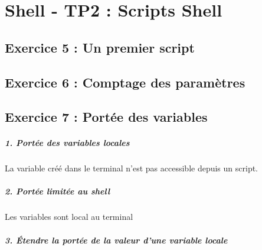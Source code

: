 \chapter{Shell - TP2 : Scripts Shell}
    \section{Exercice 5 : Un premier script}
        
    \section{Exercice 6 : Comptage des paramètres}
        
        
    \section{Exercice 7 : Portée des variables}
        \paragraph{1. Portée des variables locales}
            La variable créé dans le terminal n'est pas accessible depuis un script.
        \paragraph{2. Portée limitée au shell}
            Les variables sont local au terminal
        \paragraph{3. Étendre la portée de la valeur d’une variable locale}
